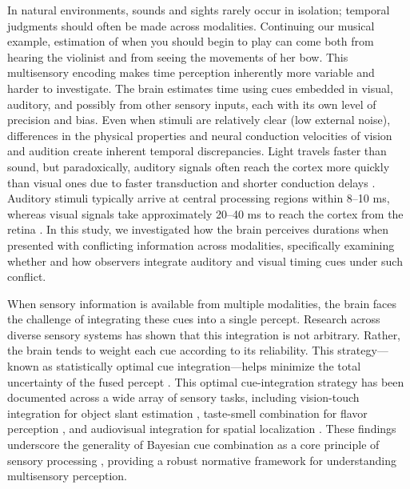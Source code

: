 \documentclass{jov}
\providecommand{\citep}[1]{\cite{#1}}
\begin{document}
In natural environments, sounds and sights rarely occur in isolation; temporal judgments should often be made across modalities. Continuing our musical example, estimation of when you should begin to play can come both from hearing the violinist and from seeing the movements of her bow. This multisensory encoding makes time perception inherently more variable and harder to investigate. The brain estimates time using cues embedded in visual, auditory, and possibly from other sensory inputs, each with its own level of precision and bias. Even when stimuli are relatively clear (low external noise), differences in the physical properties and neural conduction velocities of vision and audition create inherent temporal discrepancies. Light travels faster than sound, but paradoxically, auditory signals often reach the cortex more quickly than visual ones due to faster transduction and shorter conduction delays \citep{zoefel2017oscillatory}. Auditory stimuli typically arrive at central processing regions within 8--10 ms, whereas visual signals take approximately 20--40 ms to reach the cortex from the retina \citep{ king1985integration,vroomen2010perception}. In this study, we investigated how the brain perceives durations when presented with conflicting information across modalities, specifically examining whether and how observers integrate auditory and visual timing cues under such conflict.



When sensory information is available from multiple modalities, the brain faces the challenge of integrating these cues into a single percept. Research across diverse sensory systems has shown that this integration is not arbitrary. Rather, the brain tends to weight each cue according to its reliability. This strategy---known as statistically optimal cue integration---helps minimize the total uncertainty of the fused percept \citep{maloney1989statistical,young1993perturbation,landy1995measurement,ernst2002humans}. This optimal cue-integration strategy has been documented across a wide array of sensory tasks, including vision-touch integration for object slant estimation \citep{ernst2002humans,hillis2002combining}, taste-smell combination for flavor perception \citep{maier2020adaptive}, and audiovisual integration for spatial localization \citep{alais2004ventriloquist,negen2018bayes}. These findings underscore the generality of Bayesian cue combination as a core principle of sensory processing \citep{landy2001ideal,landy2011ideal,wolpert2011principles,alais2019cue,rossi2021mechanisms}, providing a robust normative framework for understanding multisensory perception.
\end{document}

